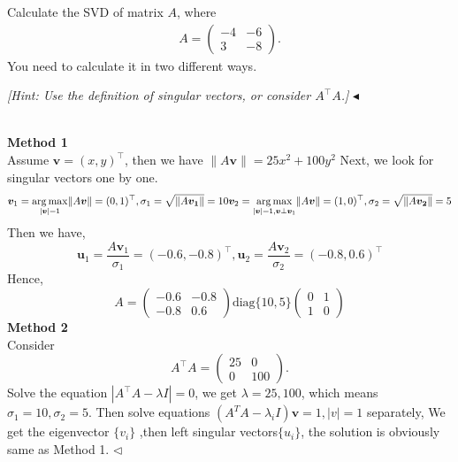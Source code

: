 \documentclass[11pt]{article}
\newenvironment{problem}[2][Problem]{\begin{trivlist}
\item[\hskip \labelsep {\bfseries #1}\hskip \labelsep {\bfseries #2.}]}{\hfill$\blacktriangleleft$\end{trivlist}}
\newenvironment{answer}[1][Answer]{\begin{trivlist}
\item[\hskip \labelsep {\bfseries #1.}\hskip \labelsep]}{\hfill$\lhd$\end{trivlist}}
\begin{document}
\begin{problem}{4 (12')}
Calculate the SVD of matrix $A$, where 
\begin{align*}
    A=\begin{pmatrix}
        -4&-6\\3&-8
    \end{pmatrix}.
\end{align*} 
You need to calculate it in two different ways.

\textit{[Hint: Use the definition of singular vectors, or consider $A^\top A$.]}
\end{problem}
\begin{answer} ~ \\
\textbf{Method 1}\\
Assume $\boldsymbol v=(x,y)^\top$, then we have $\|A\boldsymbol{v}\|=25x^2+100y^2$
Next, we look for singular vectors one by one.
$$\boldsymbol{v}_1=\underset{|\boldsymbol{v}|=1}{\arg \max} \|A\boldsymbol{v}\|=(0,1)^\top,\sigma_1=\sqrt{\|A\boldsymbol{v_1}\|}=10\\ \boldsymbol{v}_2=\underset{|\boldsymbol{v}|=1,\boldsymbol{v}\bot\boldsymbol{v}_1}{\arg \max}\|A\boldsymbol{v}\|=(1,0)^\top,\sigma_2=\sqrt{\|A\boldsymbol{v_2}\|}=5$$
Then we have,
$$\boldsymbol{u}_1=\frac{A\boldsymbol{v}_1}{\sigma_1}=(-0.6,-0.8)^\top,\boldsymbol{u}_2=\frac{A\boldsymbol{v}_2}{\sigma_2}=(-0.8,0.6)^\top$$
Hence,
$$A=\begin{pmatrix}-0.6&-0.8\\-0.8&0.6\end{pmatrix}\text{diag}\{10,5\}\begin{pmatrix}0&1\\1&0\end{pmatrix}$$
\textbf{Method 2}\\
Consider 
$$A^\top A=\begin{pmatrix}25 & 0\\0 & 100\end{pmatrix}.$$
Solve the equation $|A^\top A-\lambda I|=0$, we get $\lambda=25,100$,
which means $\sigma_1=10,\sigma_2=5$. Then solve equations $(A^TA-\lambda_iI)\boldsymbol{v}=1,|v|=1$ separately, We get the eigenvector $\{v_i\}$ ,then left singular vectors$\{u_i\}$, the solution is obviously same as Method 1.
\end{answer}
\end{document}
